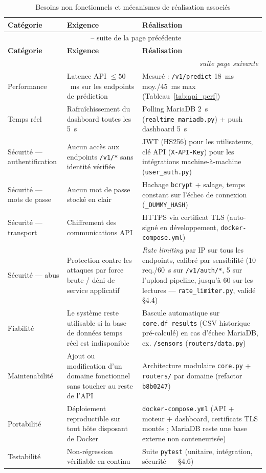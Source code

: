 \documentclass[12pt,a4paper]{report}
\begin{document}
\begin{longtable}{lp{5.2cm}p{5.6cm}}
\caption{Besoins non fonctionnels et mécanismes de réalisation associés}
\label{tab:besoins_nf}\\
\toprule
\textbf{Catégorie} & \textbf{Exigence} & \textbf{Réalisation} \\
\midrule
\endfirsthead
\multicolumn{3}{c}{\tablename~\thetable{} -- suite de la page précédente}\\
\toprule
\textbf{Catégorie} & \textbf{Exigence} & \textbf{Réalisation} \\
\midrule
\endhead
\midrule
\multicolumn{3}{r}{\textit{suite page suivante}}\\
\endfoot
\bottomrule
\endlastfoot
Performance &
  Latence API $\leq 50$~ms sur les endpoints de prédiction &
  Mesuré : \texttt{/v1/predict} 18~ms moy./45~ms max (Tableau~\ref{tab:api_perf}) \\
Temps réel &
  Rafraîchissement du dashboard toutes les 5~s &
  Polling MariaDB 2~s (\texttt{realtime\_mariadb.py}) + push dashboard 5~s \\
Sécurité --- authentification &
  Aucun accès aux endpoints \texttt{/v1/*} sans identité vérifiée &
  JWT (HS256) pour les utilisateurs, clé API (\texttt{X-API-Key}) pour les intégrations
  machine-à-machine (\texttt{user\_auth.py}) \\
Sécurité --- mots de passe &
  Aucun mot de passe stocké en clair &
  Hachage \texttt{bcrypt} + salage, temps constant sur l'échec de connexion
  (\texttt{\_DUMMY\_HASH}) \\
Sécurité --- transport &
  Chiffrement des communications API &
  HTTPS via certificat TLS \cite{rescorla2018} (auto-signé en développement, \texttt{docker-compose.yml}) \\
Sécurité --- abus &
  Protection contre les attaques par force brute / déni de service applicatif &
  \textit{Rate limiting} par IP sur tous les endpoints, calibré par sensibilité
  (10 req./60~s sur \texttt{/v1/auth/*}, 5 sur l'upload pipeline, jusqu'à 60 sur les
  lectures — \texttt{rate\_limiter.py}, validé \S4.4) \\
Fiabilité &
  Le système reste utilisable si la base de données temps réel est indisponible &
  Bascule automatique sur \texttt{core.df\_results} (CSV historique pré-calculé) en cas
  d'échec MariaDB, ex. \texttt{/sensors} (\texttt{routers/data.py}) \\
\pagebreak
Maintenabilité &
  Ajout ou modification d'un domaine fonctionnel sans toucher au reste de l'API &
  Architecture modulaire \texttt{core.py} + \texttt{routers/} par domaine (refactor
  \texttt{b8b0247}) \\
Portabilité &
  Déploiement reproductible sur tout hôte disposant de Docker &
  \texttt{docker-compose.yml} (API + moteur + dashboard, certificats TLS montés ;
  MariaDB reste une base externe non conteneurisée) \\
Testabilité &
  Non-régression vérifiable en continu &
  Suite \texttt{pytest} (unitaire, intégration, sécurité — \S4.6) \\
\end{longtable}
\end{document}

